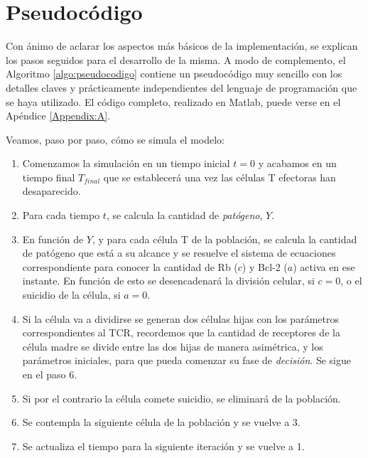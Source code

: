 \section{Pseudocódigo}

Con ánimo de aclarar los aspectos más básicos de la implementación, se explican los pasos seguidos para el desarrollo de la misma. A modo de complemento, el Algoritmo \ref{algo:pseudocodigo} contiene un pseudocódigo muy sencillo con los detalles claves y prácticamente independientes del lenguaje de programación que se haya utilizado. El código completo, realizado en Matlab, puede verse en el Apéndice \ref{Appendix:A}.

Veamos, paso por paso, cómo se simula el modelo: 

\begin{enumerate}
	\item Comenzamos la simulación en un tiempo inicial $t=0$ y acabamos en un tiempo final $T_{final}$ que se establecerá una vez las células T efectoras han desaparecido. 
	
	\item Para cada tiempo $t$, se calcula la cantidad de \textit{patógeno}, $Y$. 
	
	\item En función de $Y$, y para cada célula T de la población, se calcula la cantidad de patógeno que está a su alcance y se resuelve el sistema de ecuaciones correspondiente para conocer la cantidad de Rb ($c$) y Bcl-2 ($a$) activa en ese instante. En función de esto se desencadenará la división celular, si $c = 0$, o el suicidio de la célula, si $a = 0$.
	
	\item Si la célula va a dividirse se generan dos células hijas con los parámetros correspondientes al TCR, recordemos que la cantidad de receptores de la célula madre se divide entre las dos hijas de manera asimétrica, y los parámetros iniciales, para que pueda comenzar su fase de \textit{decisión}. Se sigue en el paso 6.
	
	\item Si por el contrario la célula comete suicidio, se eliminará de la población. 

	\item Se contempla la siguiente célula de la población y se vuelve a 3.
	
	\item Se actualiza el tiempo para la siguiente iteración y se vuelve a 1.
\end{enumerate}



